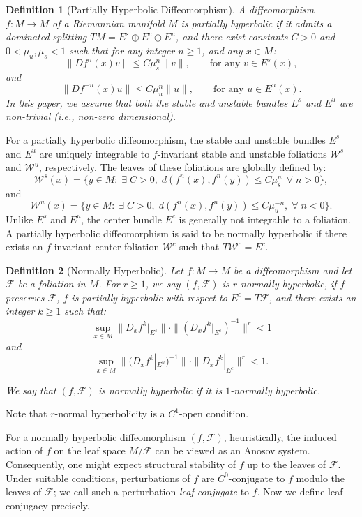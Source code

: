 \documentclass[11pt]{amsart}
\numberwithin{equation}{section}
\theoremstyle{plain}
\newtheorem{defi}{Definition}[section]
\begin{document}
\begin{defi}[Partially Hyperbolic Diffeomorphism]\label{defi:ph}
A diffeomorphism $f:M\to M$ of a Riemannian manifold $M$ is \emph{partially hyperbolic} if it admits a \emph{dominated splitting} $TM=E^s\oplus E^c\oplus E^u$, and there exist constants $C>0$ and $0<\mu_u,\mu_s<1$ such that for any integer $n \ge 1$, and any $x\in M$:
$$
\|Df^n(x)v\|\le C\mu_s^n\|v\|,\qquad \text{for any } v\in E^s(x),
$$
and
$$
\|Df^{-n}(x)u\|\le C\mu_u^n\|u\|,\qquad \text{for any } u\in E^u(x).
$$
In this paper, we assume that both the stable and unstable bundles $E^s$ and $E^u$ are non-trivial (i.e., non-zero dimensional).
\end{defi}

For a partially hyperbolic diffeomorphism, the stable and unstable bundles $E^s$ and $E^u$ are uniquely integrable to $f$-invariant stable and unstable foliations $\mathcal{W}^s$ and $\mathcal{W}^u$, respectively. The leaves of these foliations are globally defined by:
$$
\mathcal{W}^s(x)=\{y\in M:\; \exists\; C>0,\; d(f^n(x),f^n(y))\le C\mu_s^n \,\; \forall\; n>0 \},
$$
and
$$
\mathcal{W}^u(x)=\{y\in M: \;\exists\; C>0, \;d(f^n(x),f^n(y))\le C\mu_u^{-n} , \;\forall\; n<0 \}.
$$
Unlike $E^s$ and $E^u$, the center bundle $E^c$ is generally not integrable to a foliation. A partially hyperbolic diffeomorphism is said to be normally hyperbolic if there exists an $f$-invariant center foliation $\mathcal{W}^c$ such that $T\mathcal{W}^c = E^c$.

\begin{defi}[Normally Hyperbolic]
Let $f:M\to M$ be a diffeomorphism and let $\mathcal{F}$ be a foliation in $M$. For $r\ge 1$, we say $(f,\mathcal F)$ is \emph{$r$-normally hyperbolic}, if $f$ preserves $\mathcal{F}$, $f$ is partially hyperbolic with respect to $E^c=T\mathcal{F}$, and there exists an integer $k \ge 1$ such that: 
$$
\sup_{x\in M}\|D_xf^k|_{E^s}\|\cdot \|(D_xf^k|_{E^c})^{-1}\|^r<1
$$
and
$$
\sup_{x\in M}\|(D_xf^k|_{E^u})^{-1}\|\cdot \|D_xf^{k}|_{E^c}\|^r<1.
$$

We say that $(f,\mathcal F)$ is \emph{normally hyperbolic} if it is $1$-normally hyperbolic.
\end{defi}

Note that $r$-normal hyperbolicity is a $C^1$-open condition.

For a normally hyperbolic diffeomorphism $(f,\mathcal{F})$, heuristically, the induced action of $f$ on the leaf space $M/\mathcal{F}$ can be viewed as an Anosov system. Consequently, one might expect structural stability of $f$ up to the leaves of $\mathcal{F}$. Under suitable conditions, perturbations of $f$ are $C^0$-conjugate to $f$ modulo the leaves of $\mathcal{F}$; we call such a perturbation \emph{leaf conjugate} to $f$. Now we define leaf conjugacy precisely.
\end{document}
